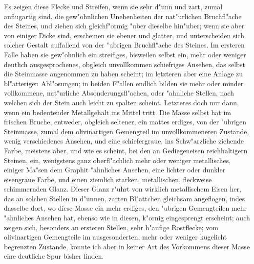 \documentclass[a4paper, 11pt, oneside, german]{article}
\begin{document}
Es zeigen diese Flecke und Streifen, wenn sie sehr d"unn und zart, zumal anflugartig sind, die gew"ohnlichen Unebenheiten der nat"urlichen Bruchfl"ache des Steines, und ziehen sich gleichf"ormig "uber dieselbe hin"uber; wenn sie aber von einiger Dicke sind, erscheinen sie ebener und glatter, und unterscheiden sich solcher Gestalt auffallend von der "ubrigen Bruchfl"ache des Steines. Im ersteren Falle haben sie gew"ohnlich ein streifiges, bisweilen selbst ein, mehr oder weniger deutlich ausgesprochenes, obgleich unvollkommen schiefriges Ansehen, das selbst die Steinmasse angenommen zu haben scheint; im letzteren aber eine Anlage zu bl"atterigen Abl"osungen; in beiden F"allen endlich bilden sie mehr oder minder vollkommene, nat"urliche Absonderungsfl"achen, oder "ahnliche Stellen, nach welchen sich der Stein auch leicht zu spalten scheint. Letzteres doch nur dann, wenn ein bedeutender Metallgehalt ins Mittel tritt. Die Masse selbst hat im frischen Bruche, entweder, obgleich seltener, ein mattes erdiges, von der "ubrigen Steinmasse, zumal dem olivinartigen Gemengteil im unvollkommeneren Zustande, wenig verschiedenes Ansehen, und eine schiefergraue, ins Schw"arzliche ziehende Farbe, meistens aber, und wie es scheint, bei den an Gediegeneisen reichhaltigern Steinen, ein, wenigstens ganz oberfl"achlich mehr oder weniger metallisches, einiger Ma"sen dem Graphit "ahnliches Ansehen, eine lichter oder dunkler eisengraue Farbe, und einen ziemlich starken, metallischen, fleckweise schimmernden Glanz. Dieser Glanz r"uhrt von wirklich metallischem Eisen her, das an solchen Stellen in d"unnen, zarten Bl"attchen gleichsam angeflogen, indes dasselbe dort, wo diese Masse ein mehr erdiges, den "ubrigen Gemengteilen mehr "ahnliches Ansehen hat, ebenso wie in diesen, k"ornig eingesprengt erscheint; auch zeigen sich, besonders an ersteren Stellen, sehr h"aufige Rostflecke; vom olivinartigen Gemengteile im ausgesonderten, mehr oder weniger kugelicht begrenzten Zustande, konnte ich aber in keiner Art des Vorkommens dieser Masse eine deutliche Spur bisher finden.
\end{document}
